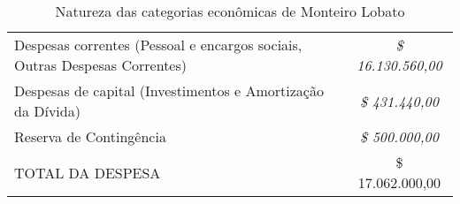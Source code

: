 \begin{table}[htbp]
	\centering
	\caption{Natureza das categorias econômicas de Monteiro Lobato}
	\begin{tabular}{p{19.455em}c}
		\rowcolor[rgb]{ .969,  .588,  .275} \textcolor[rgb]{ 1,  1,  1}{Despesas correntes (Pessoal e encargos sociais, Outras Despesas Correntes)} & \cellcolor[rgb]{ .992,  .914,  .851}\textit{ \$         16.130.560,00 } \\
		\rowcolor[rgb]{ .969,  .588,  .275} \textcolor[rgb]{ 1,  1,  1}{Despesas de capital (Investimentos e Amortização da Dívida)} & \cellcolor[rgb]{ .984,  .831,  .706}\textit{ \$              431.440,00 } \\
		\rowcolor[rgb]{ .969,  .588,  .275} \textcolor[rgb]{ 1,  1,  1}{Reserva de Contingência} & \cellcolor[rgb]{ .992,  .914,  .851}\textit{ \$              500.000,00 } \\
		\rowcolor[rgb]{ .969,  .588,  .275} \textcolor[rgb]{ 1,  1,  1}{TOTAL DA DESPESA} & \cellcolor[rgb]{ .984,  .831,  .706} \$      17.062.000,00  \\
	\end{tabular}%
	\label{tab:acoes_emerg}%
\end{table}%


